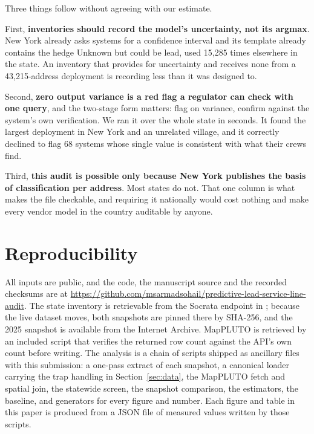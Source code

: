 \documentclass[11pt]{article}
\newcommand{\CBL}{\textsf{Unknown but could be lead}}
\begin{document}
Three things follow without agreeing with our estimate.

First, \textbf{inventories should record the model's uncertainty, not its argmax}. New York
already asks systems for a confidence interval \cite{nysdohguidance2025} and its template
already contains the hedge \CBL{}, used 15,285 times elsewhere in the state. An inventory that
provides for uncertainty and receives none from a 43,215-address deployment is recording less
than it was designed to.

Second, \textbf{zero output variance is a red flag a regulator can check with one query}, and
the two-stage form matters: flag on variance, confirm against the system's own verification.
We ran it over the whole state in seconds. It found the largest deployment in New York and an
unrelated village, and it correctly declined to flag 68 systems whose single value is
consistent with what their crews find.

Third, \textbf{this audit is possible only because New York publishes the basis of
classification per address}. Most states do not. That one column is what makes the file
checkable, and requiring it nationally would cost nothing and make every vendor model in the
country auditable by anyone.

\section{Reproducibility}\label{sec:repro}

All inputs are public, and the code, the manuscript source and the recorded checksums are at
\url{https://github.com/msarmadsohail/predictive-lead-service-line-audit}. The state inventory
is retrievable from the Socrata endpoint in
\cite{nyslsl2026}; because the live dataset moves, both snapshots are pinned there by SHA-256,
and the 2025 snapshot is available from the Internet Archive. MapPLUTO is retrieved by an
included script that verifies the returned row count against the API's own count before
writing. The analysis is a chain of scripts shipped as ancillary files with this submission:
a one-pass extract of each snapshot, a canonical loader carrying the trap handling in
Section~\ref{sec:data}, the MapPLUTO fetch and spatial join, the statewide screen, the
snapshot comparison, the estimators, the baseline, and generators for every figure and number.
Each figure and table in this paper is produced from a JSON file of measured values written by
those scripts.
\end{document}
